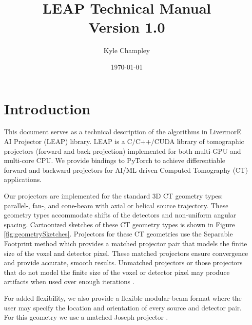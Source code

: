 \documentclass[11pt]{article}
\title{LEAP Technical Manual \\ Version 1.0}
\author{Kyle Champley}
\date{\today}
\begin{document}
\newcommand{\B}[1]{\textbf{#1}}
\newcommand{\ra}{\rightarrow}
\newcommand{\sinc}{\text{sinc}}
\newcommand{\supp}{\text{supp}}
\newcommand{\suppe}{\text{supp}_{\varepsilon}}
\newcommand{\ind}{\B{1}}
\newcommand{\sgn}{\text{sgn}}
\newcommand{\etal}{\text{et al. }}
\newcommand{\Beta}{{\boldsymbol\beta}}
\newcommand{\Radon}{\mathcal{R}}
\newcommand{\Xray}{\mathcal{P}}
\newcommand{\Fourier}{\mathcal{F}}
\newcommand{\Hilbert}{\mathcal{H}}
\newcommand{\Identity}{\mathcal{I}}
\newcommand{\BL}{\mathcal{L}}
\newcommand{\R}{\mathcal{R}}
\newcommand{\Cov}{\text{Cov}}
\newcommand{\argmin}{\operatorname{argmin}}

\maketitle



\section{Introduction}

This document serves as a technical description of the algorithms in LivermorE AI Projector (LEAP) library.  LEAP is a C/C++/CUDA library of tomographic projectors (forward and back projection) implemented for both multi-GPU and multi-core CPU. We provide bindings to PyTorch to achieve differentiable forward and backward projectors for AI/ML-driven Computed Tomography (CT) applications.

Our projectors are implemented for the standard 3D CT geometry types: parallel-, fan-, and cone-beam with axial or helical source trajectory. These geometry types accommodate shifts of the detectors and non-uniform angular spacing. Cartoonized sketches of these CT geometry types is shown in Figure \ref{fig:geometrySketches}. Projectors for these CT geometries use the Separable Footprint method \cite{Long_TMI_2010} which provides a matched projector pair that models the finite size of the voxel and detector pixel. These matched projectors ensure convergence and provide accurate, smooth results. Unmatched projectors or those projectors that do not model the finite size of the voxel or detector pixel may produce artifacts when used over enough iterations \cite{DeManBasu_PMB_2004}.

For added flexibility, we also provide a flexible modular-beam format where the user may specify the location and orientation of every source and detector pair.  For this geometry we use a matched Joseph projector \cite{Joseph_TMI_1982}.
\end{document}
